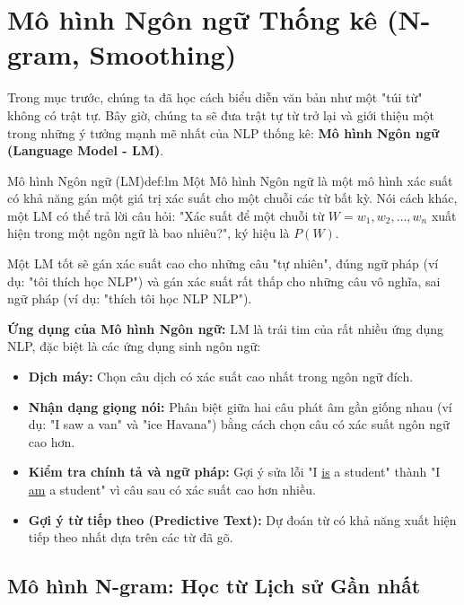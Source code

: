 
\section{Mô hình Ngôn ngữ Thống kê (N-gram, Smoothing)}
\label{sec:statistical_lm}

Trong mục trước, chúng ta đã học cách biểu diễn văn bản như một "túi từ" không có trật tự. Bây giờ, chúng ta sẽ đưa trật tự từ trở lại và giới thiệu một trong những ý tưởng mạnh mẽ nhất của NLP thống kê: \textbf{Mô hình Ngôn ngữ (Language Model - LM)}.

\begin{definition}{Mô hình Ngôn ngữ (LM)}{def:lm}
    Một Mô hình Ngôn ngữ là một mô hình xác suất có khả năng gán một giá trị xác suất cho một chuỗi các từ bất kỳ. Nói cách khác, một LM có thể trả lời câu hỏi: "Xác suất để một chuỗi từ $W = w_1, w_2, \dots, w_n$ xuất hiện trong một ngôn ngữ là bao nhiêu?", ký hiệu là $P(W)$.
\end{definition}

Một LM tốt sẽ gán xác suất cao cho những câu "tự nhiên", đúng ngữ pháp (ví dụ: "tôi thích học NLP") và gán xác suất rất thấp cho những câu vô nghĩa, sai ngữ pháp (ví dụ: "thích tôi học NLP NLP").

\textbf{Ứng dụng của Mô hình Ngôn ngữ:}
LM là trái tim của rất nhiều ứng dụng NLP, đặc biệt là các ứng dụng sinh ngôn ngữ:
\begin{itemize}
    \item \textbf{Dịch máy:} Chọn câu dịch có xác suất cao nhất trong ngôn ngữ đích.
    \item \textbf{Nhận dạng giọng nói:} Phân biệt giữa hai câu phát âm gần giống nhau (ví dụ: "I saw a van" và "ice Havana") bằng cách chọn câu có xác suất ngôn ngữ cao hơn.
    \item \textbf{Kiểm tra chính tả và ngữ pháp:} Gợi ý sửa lỗi "I \underline{is} a student" thành "I \underline{am} a student" vì câu sau có xác suất cao hơn nhiều.
    \item \textbf{Gợi ý từ tiếp theo (Predictive Text):} Dự đoán từ có khả năng xuất hiện tiếp theo nhất dựa trên các từ đã gõ.
\end{itemize}

\subsection{Mô hình N-gram: Học từ Lịch sử Gần nhất}
\label{ssec:ngram}


